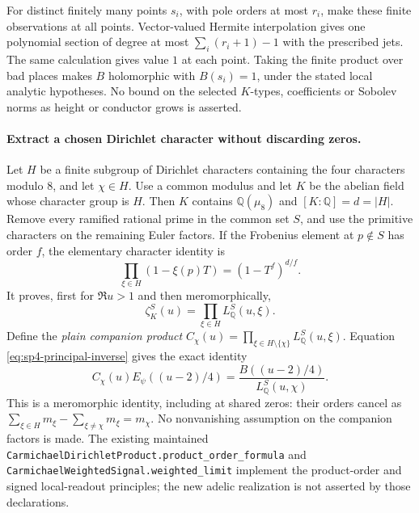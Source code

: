 For distinct finitely many points \(s_i\), with pole orders at most
\(r_i\), make these finite observations at all points. Vector-valued
Hermite interpolation gives one polynomial section of degree at most
\(\sum_i(r_i+1)-1\) with the prescribed jets. The same calculation
gives value \(1\) at each point. Taking the finite product over bad
places makes \(B\) holomorphic with \(B(s_i)=1\), under the stated
local analytic hypotheses. No bound on the selected \(K\)-types,
coefficients or Sobolev norms as height or conductor grows is asserted.

\paragraph{Extract a chosen Dirichlet character without discarding zeros.}
Let \(H\) be a finite subgroup of Dirichlet characters containing
the four characters modulo \(8\), and let \(\chi\in H\).
Use a common modulus and let \(K\) be the abelian field whose
character group is \(H\). Then \(K\) contains \(\mathbb Q(\mu_8)\)
and \([K:\mathbb Q]=d=|H|\). Remove every ramified rational prime
in the common set \(S\), and use the primitive characters on the
remaining Euler factors. If the Frobenius element at \(p\notin S\)
has order \(f\), the elementary character identity is
\[
 \prod_{\xi\in H}(1-\xi(p)T)=(1-T^f)^{d/f}.
\]
It proves, first for \(\Re u>1\) and then meromorphically,
\[
 \zeta_K^S(u)=\prod_{\xi\in H}L_{\mathbb Q}^S(u,\xi).
\]
Define the \emph{plain companion product}
\(C_\chi(u)=\prod_{\xi\in H\setminus\{\chi\}}
L_{\mathbb Q}^S(u,\xi)\). Equation
\eqref{eq:sp4-principal-inverse} gives the exact identity
\begin{equation}\label{eq:sp4-character-extraction}
 C_\chi(u)E_\psi((u-2)/4)
   =\frac{B((u-2)/4)}{L_{\mathbb Q}^S(u,\chi)}.
\end{equation}
This is a meromorphic identity, including at shared zeros: their orders
cancel as \(\sum_{\xi\in H}m_\xi-
\sum_{\xi\ne\chi}m_\xi=m_\chi\). No nonvanishing assumption on
the companion factors is made. The existing maintained
\texttt{CarmichaelDirichletProduct.product\_order\_formula}
and \texttt{CarmichaelWeightedSignal.weighted\_limit} implement
the product-order and signed local-readout principles; the new
adelic realization is not asserted by those declarations.

